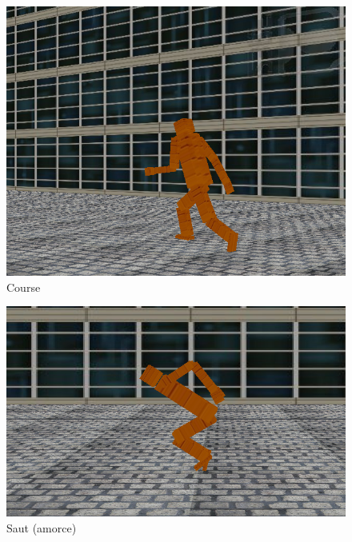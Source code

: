\documentclass[10pt,a4paper,titlepage]{article}
\begin{document}
\begin{figure}[H]
\centering
\includegraphics[width=1\textwidth]{run.png}
\caption{Course}
\end{figure}

\begin{figure}[H]
\centering
\includegraphics[width=1\textwidth]{saut1.png}
\caption{Saut (amorce)}
\end{figure}
\end{document}
